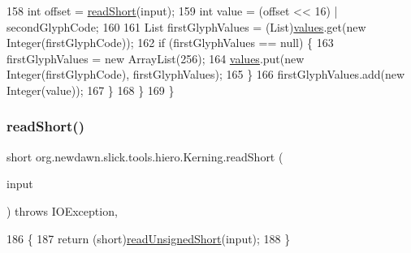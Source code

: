 \begin{DoxyCode}
158                 \textcolor{keywordtype}{int} offset = \mbox{\hyperlink{classorg_1_1newdawn_1_1slick_1_1tools_1_1hiero_1_1_kerning_a85a04fa801cb219c4555d38195ca6d47}{readShort}}(input);
159                 \textcolor{keywordtype}{int} value = (offset << 16) | secondGlyphCode;
160 
161                 List firstGlyphValues = (List)\mbox{\hyperlink{classorg_1_1newdawn_1_1slick_1_1tools_1_1hiero_1_1_kerning_a2fb8954e8eb2c071e18a4e14b19ce352}{values}}.get(\textcolor{keyword}{new} Integer(firstGlyphCode));
162                 \textcolor{keywordflow}{if} (firstGlyphValues == null) \{
163                     firstGlyphValues = \textcolor{keyword}{new} ArrayList(256);
164                     \mbox{\hyperlink{classorg_1_1newdawn_1_1slick_1_1tools_1_1hiero_1_1_kerning_a2fb8954e8eb2c071e18a4e14b19ce352}{values}}.put(\textcolor{keyword}{new} Integer(firstGlyphCode), firstGlyphValues);
165                 \}
166                 firstGlyphValues.add(\textcolor{keyword}{new} Integer(value));
167             \}
168         \}
169     \}
\end{DoxyCode}
\mbox{\label{classorg_1_1newdawn_1_1slick_1_1tools_1_1hiero_1_1_kerning_a85a04fa801cb219c4555d38195ca6d47}} 
\subsubsection{\texorpdfstring{read\+Short()}{readShort()}}
{\footnotesize\ttfamily short org.\+newdawn.\+slick.\+tools.\+hiero.\+Kerning.\+read\+Short (\begin{DoxyParamCaption}\item[{Input\+Stream}]{input }\end{DoxyParamCaption}) throws I\+O\+Exception\hspace{0.3cm}{\ttfamily [inline]}, {\ttfamily [private]}}


\begin{DoxyCode}
186                                                                    \{
187         \textcolor{keywordflow}{return} (\textcolor{keywordtype}{short})\mbox{\hyperlink{classorg_1_1newdawn_1_1slick_1_1tools_1_1hiero_1_1_kerning_a8e409fe133f0b1741ba0c5a52ef13910}{readUnsignedShort}}(input);
188     \}
\end{DoxyCode}
\mbox{\label{classorg_1_1newdawn_1_1slick_1_1tools_1_1hiero_1_1_kerning_a07ee19cb53c5f0230a1eb88cb2d4ce75}} 
